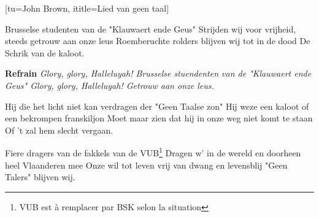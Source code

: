 [tu={John Brown},
ititle={Lied van geen taal}]

\beginverse
Brusselse studenten van de "Klauwaert ende Geus"
Strijden wij voor vrijheid, steeds getrouw aan onze leus
Roemberuchte rolders blijven wij tot in de dood
De Schrik van de kaloot.
\endverse

\beginchorus
\textbf{Refrain}
\textit{Glory, glory, Halleluyah!
	Brusselse stuendenten van de "Klauwaert ende Geus"
	Glory, glory, Halleluyah!
	Getrouw aan onze leus.}
\endchorus

\beginverse
Hij die het licht niet kan verdragen der "Geen Taalse zon"
Hij weze een kaloot of een bekrompen franskiljon
Moet maar zien dat hij in onze weg niet komt te staan
Of 't zal hem slecht vergaan.
\endverse

\beginverse
Fiere dragers van de fakkels van de VUB\footnote[1]{VUB est à remplacer par BSK selon la situation}
Dragen w' in de wereld en doorheen heel Vlaanderen mee
Onze wil tot leven vrij van dwang en levensblij
"Geen Talers" blijven wij.
\endverse
\endsong